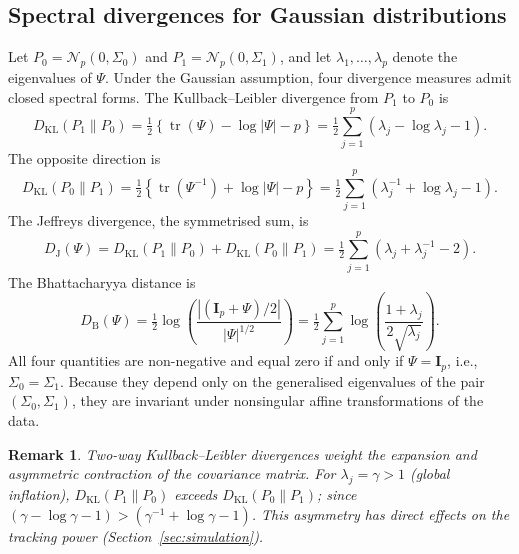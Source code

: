 \documentclass[11pt,a4paper]{article}
\newtheorem{remark}{Remark}
\DeclareMathOperator{\tr}{tr}
\newcommand{\I}{\mathbf{I}}
\newcommand{\calN}{\mathcal{N}}
\newcommand{\KL}{\mathrm{KL}}
\newcommand{\J}{\mathrm{J}}
\newcommand{\Bhat}{\mathrm{B}}
\begin{document}
\subsection{Spectral divergences for Gaussian distributions}

Let $P_{0}=\calN_{p}(0,\Sigma_{0})$ and $P_{1}=\calN_{p}(0,\Sigma_{1})$, and
let $\lambda_{1},\ldots,\lambda_{p}$ denote the eigenvalues of $\Psi$.  Under
the Gaussian assumption, four divergence measures admit closed spectral forms.
The Kullback--Leibler divergence from $P_{1}$ to $P_{0}$ is
\begin{equation}
D_{\KL}(P_{1}\|P_{0})
=
\tfrac{1}{2}\!\left\{\tr(\Psi)-\log|\Psi|-p\right\}
=
\tfrac{1}{2}\sum_{j=1}^{p}\!\left(\lambda_{j}-\log\lambda_{j}-1\right).
\label{eq:KL10}
\end{equation}
The opposite direction is
\begin{equation}
D_{\KL}(P_{0}\|P_{1})
=
\tfrac{1}{2}\!\left\{\tr(\Psi^{-1})+\log|\Psi|-p\right\}
=
\tfrac{1}{2}\sum_{j=1}^{p}\!\left(\lambda_{j}^{-1}+\log\lambda_{j}-1\right).
\label{eq:KL01}
\end{equation}
The Jeffreys divergence, the symmetrised sum, is
\begin{equation}
D_{\J}(\Psi)
= D_{\KL}(P_{1}\|P_{0}) + D_{\KL}(P_{0}\|P_{1})
= \tfrac{1}{2}\sum_{j=1}^{p}\!\left(\lambda_{j}+\lambda_{j}^{-1}-2\right).
\label{eq:Jeffreys}
\end{equation}
The Bhattacharyya distance is
\begin{equation}
D_{\Bhat}(\Psi)
=
\tfrac{1}{2}\log\!\left(\frac{|(\I_{p}+\Psi)/2|}{|\Psi|^{1/2}}\right)
=
\tfrac{1}{2}\sum_{j=1}^{p}\log\!\left(\frac{1+\lambda_{j}}{2\sqrt{\lambda_{j}}}\right).
\label{eq:Bhatt}
\end{equation}
All four quantities are non-negative and equal zero if and only if $\Psi=\I_{p}$,
i.e., $\Sigma_{0}=\Sigma_{1}$.  Because they depend only on the generalised
eigenvalues of the pair $(\Sigma_{0},\Sigma_{1})$, they are invariant under
nonsingular affine transformations of the data.

\begin{remark}
Two-way Kullback–Leibler divergences weight the expansion
and asymmetric contraction of the covariance matrix. For $\lambda_{j}=\gamma>1$ (global inflation),
$D_{\KL}(P_{1}\|P_{0})$ exceeds $D_{\KL}(P_{0}\|P_{1})$; since
$(\gamma-\log\gamma-1)>(\gamma^{-1}+\log\gamma-1)$.
This asymmetry has direct effects on the tracking power
(Section~\ref{sec:simulation}).
\end{remark}
\end{document}
